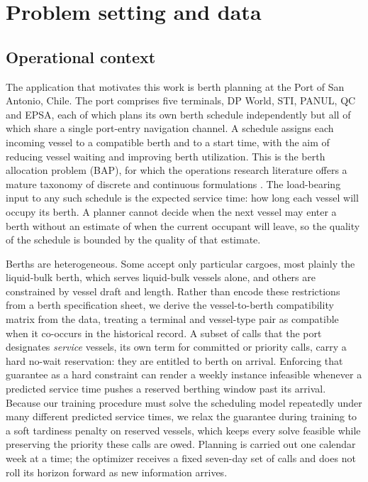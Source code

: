\section{Problem setting and data}\label{sec:problem}

\subsection{Operational context}\label{sec:context}

The application that motivates this work is berth planning at the Port of San
Antonio, Chile. The port comprises five terminals, DP World, STI, PANUL, QC and
EPSA, each of which plans its own berth schedule independently but all of which
share a single port-entry navigation channel. A schedule assigns each incoming
vessel to a compatible berth and to a start time, with the aim of reducing vessel
waiting and improving berth utilization. This is the berth allocation problem
(BAP), for which the operations research literature offers a mature taxonomy of
discrete and continuous formulations \citep{bierwirth2010survey}. The load-bearing
input to any such schedule is the expected service time: how long each vessel will
occupy its berth. A planner cannot decide when the next vessel may enter a berth
without an estimate of when the current occupant will leave, so the quality of the
schedule is bounded by the quality of that estimate.

Berths are heterogeneous. Some accept only particular cargoes, most plainly the
liquid-bulk berth, which serves liquid-bulk vessels alone, and others are
constrained by vessel draft and length. Rather than encode these restrictions from
a berth specification sheet, we derive the vessel-to-berth compatibility matrix
from the data, treating a terminal and vessel-type pair as compatible when it
co-occurs in the historical record. A subset of calls that the port designates
\emph{service} vessels, its own term for committed or priority calls, carry a hard
no-wait reservation: they are entitled to berth on arrival. Enforcing that
guarantee as a hard constraint can render a weekly instance infeasible whenever a
predicted service time pushes a reserved berthing window past its arrival. Because
our training procedure must solve the scheduling model repeatedly under many
different predicted service times, we relax the guarantee during training to a soft
tardiness penalty on reserved vessels, which keeps every solve feasible while
preserving the priority these calls are owed. Planning is carried out one calendar
week at a time; the optimizer receives a fixed seven-day set of calls and does not
roll its horizon forward as new information arrives.

